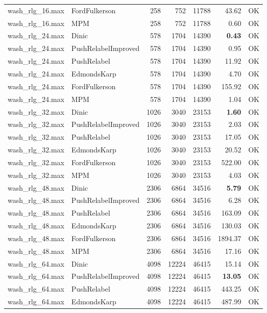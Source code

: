 \begin{longtable}{llrrrrl}
wash\_rlg\_16.max & FordFulkerson & 258 & 752 & 11788 & 43.62 & OK \\
wash\_rlg\_16.max & MPM & 258 & 752 & 11788 & 0.60 & OK \\
\midrule
wash\_rlg\_24.max & Dinic & 578 & 1704 & 14390 & \textbf{0.43} & OK \\
wash\_rlg\_24.max & PushRelabelImproved & 578 & 1704 & 14390 & 0.95 & OK \\
wash\_rlg\_24.max & PushRelabel & 578 & 1704 & 14390 & 11.92 & OK \\
wash\_rlg\_24.max & EdmondsKarp & 578 & 1704 & 14390 & 4.70 & OK \\
wash\_rlg\_24.max & FordFulkerson & 578 & 1704 & 14390 & 155.92 & OK \\
wash\_rlg\_24.max & MPM & 578 & 1704 & 14390 & 1.04 & OK \\
\midrule
wash\_rlg\_32.max & Dinic & 1026 & 3040 & 23153 & \textbf{1.60} & OK \\
wash\_rlg\_32.max & PushRelabelImproved & 1026 & 3040 & 23153 & 2.03 & OK \\
wash\_rlg\_32.max & PushRelabel & 1026 & 3040 & 23153 & 17.05 & OK \\
wash\_rlg\_32.max & EdmondsKarp & 1026 & 3040 & 23153 & 20.52 & OK \\
wash\_rlg\_32.max & FordFulkerson & 1026 & 3040 & 23153 & 522.00 & OK \\
wash\_rlg\_32.max & MPM & 1026 & 3040 & 23153 & 4.03 & OK \\
\midrule
wash\_rlg\_48.max & Dinic & 2306 & 6864 & 34516 & \textbf{5.79} & OK \\
wash\_rlg\_48.max & PushRelabelImproved & 2306 & 6864 & 34516 & 6.28 & OK \\
wash\_rlg\_48.max & PushRelabel & 2306 & 6864 & 34516 & 163.09 & OK \\
wash\_rlg\_48.max & EdmondsKarp & 2306 & 6864 & 34516 & 130.03 & OK \\
wash\_rlg\_48.max & FordFulkerson & 2306 & 6864 & 34516 & 1894.37 & OK \\
wash\_rlg\_48.max & MPM & 2306 & 6864 & 34516 & 17.16 & OK \\
\midrule
wash\_rlg\_64.max & Dinic & 4098 & 12224 & 46415 & 15.14 & OK \\
wash\_rlg\_64.max & PushRelabelImproved & 4098 & 12224 & 46415 & \textbf{13.05} & OK \\
wash\_rlg\_64.max & PushRelabel & 4098 & 12224 & 46415 & 443.25 & OK \\
wash\_rlg\_64.max & EdmondsKarp & 4098 & 12224 & 46415 & 487.99 & OK \\

\end{longtable}
